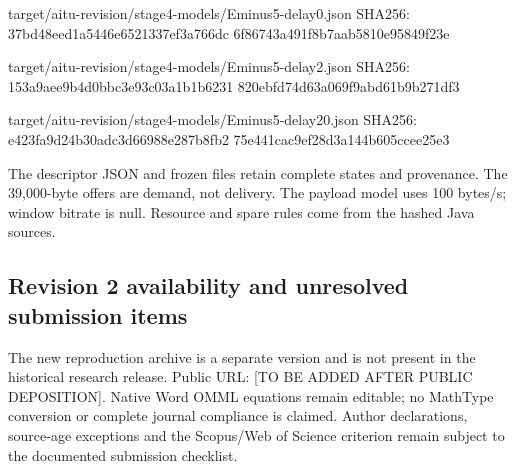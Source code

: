 \documentclass[12pt,a4paper]{article}
\begin{document}
target/aitu-revision/stage4-models/Eminus5-delay0.json\newline{}
SHA256: 37bd48eed1a5446e6521337ef3a766dc\newline{}
6f86743a491f8b7aab5810e95849f23e

target/aitu-revision/stage4-models/Eminus5-delay2.json\newline{}
SHA256: 153a9aee9b4d0bbc3e93c03a1b1b6231\newline{}
820ebfd74d63a069f9abd61b9b271df3

target/aitu-revision/stage4-models/Eminus5-delay20.json\newline{}
SHA256: e423fa9d24b30adc3d66988e287b8fb2\newline{}
75e441cac9ef28d3a144b605ccee25e3

The descriptor JSON and frozen files retain complete states and provenance. The 39,000-byte offers are demand, not delivery. The payload model uses 100 bytes/s; window bitrate is null. Resource and spare rules come from the hashed Java sources.

\subsection*{Revision 2 availability and unresolved submission items}
The new reproduction archive is a separate version and is not present in the historical research release. Public URL: [TO BE ADDED AFTER PUBLIC DEPOSITION]. Native Word OMML equations remain editable; no MathType conversion or complete journal compliance is claimed. Author declarations, source-age exceptions and the Scopus/Web of Science criterion remain subject to the documented submission checklist.
\end{document}
